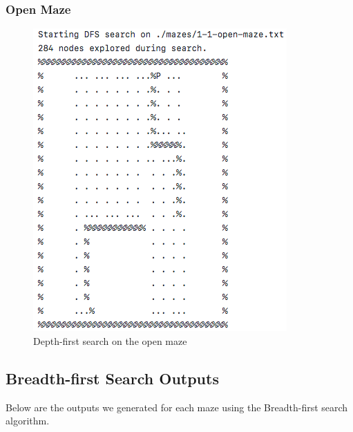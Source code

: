 \documentclass[titlepage]{article}
\begin{document}
\subsubsection{Open Maze}
\begin{figure}[h!]
\includegraphics[width=\linewidth]{dfsopen.png}
\caption{Depth-first search on the open maze}
\label{fig:DFSopen}
\end{figure}

\newpage
\subsection{Breadth-first Search Outputs}
Below are the outputs we generated for each maze using the Breadth-first search algorithm. 
\end{document}
